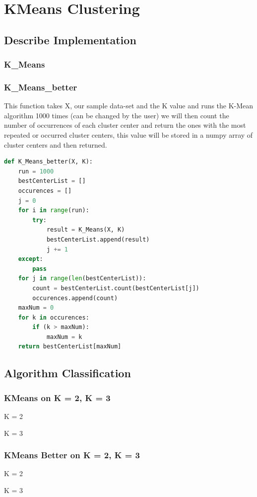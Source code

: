 \documentclass{article}
\begin{document}
	\section{KMeans Clustering}
	\subsection{Describe Implementation}
	
	\subsubsection{K\_Means}
	\subsubsection{K\_Means\_better}
	This function takes X, our sample data-set and the K value and runs the K-Mean algorithm 1000 times (can be changed by the user) we will then count the number of occurrences of each cluster center and return the ones with the most repeated or occurred cluster centers, this value will be stored in a numpy array of cluster centers and then returned.
	\begin{lstlisting}[language=Python]
	def K_Means_better(X, K):
	run = 1000
	bestCenterList = []
	occurences = []
	j = 0
	for i in range(run):
		try:
			result = K_Means(X, K)
			bestCenterList.append(result)
			j += 1
	except:
		pass
	for j in range(len(bestCenterList)):
		count = bestCenterList.count(bestCenterList[j])
		occurences.append(count)
	maxNum = 0
	for k in occurences:
		if (k > maxNum):
			maxNum = k
	return bestCenterList[maxNum]
	\end{lstlisting}
	\subsection{Algorithm Classification}
	\subsubsection{KMeans on K = 2, K = 3}
	\begin{center}
		K = 2
	\end{center}
	\begin{center}
		K = 3
	\end{center}
	
	\subsubsection{KMeans Better on K = 2, K = 3}
	\begin{center}
		K = 2
	\end{center}
	\begin{center}
		K = 3
	\end{center}
	
\end{document}
